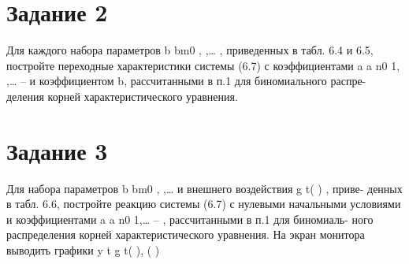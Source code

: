 \documentclass[a4paper, 12pt]{article}
\begin{document}
    \section{Задание 2}
    Для каждого набора параметров b bm0 , ,… , приведенных в табл. 6.4 и
    6.5, постройте переходные характеристики системы (6.7) с коэффициентами
    a a n0 1, ,… -- и коэффициентом b, рассчитанными в п.1 для биномиального распре-
    деления корней характеристического уравнения.


    \section{Задание 3}
    Для набора параметров b bm0 , ,… и внешнего воздействия g t( ) , приве-
    денных в табл. 6.6, постройте реакцию системы (6.7) с нулевыми начальными
    условиями и коэффициентами a a n0 1,… -- , рассчитанными в п.1 для биномиаль-
    ного распределения корней характеристического уравнения. На экран монитора
    выводить графики y t g t( ), ( ) 
\end{document}

